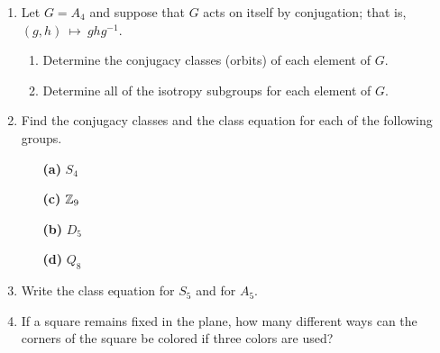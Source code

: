 {\begin{enumerate}
 
\bf\item\rm
Let $G =  A_4$ and suppose that $G$ acts on itself by conjugation;
that is, $(g,h)~\mapsto~ghg^{-1}$. 
\begin{enumerate}
 
 \bf\item\rm
Determine the conjugacy classes (orbits) of each element of $G$.
 
 \bf\item\rm
Determine all of the isotropy subgroups for each element of $G$.
 
\end{enumerate}
 
 
\bf\item\rm
Find the conjugacy classes and the class equation for each of the
following groups. 
 
\vspace{3pt}
 
\hspace{-7pt}
\begin{minipage}[t]{4.6in}
\noindent
\begin{minipage}[t]{2.25in}
\begin{itemize}
 
 \item[{\bf (a)}]
$S_4$
 
 \item[{\bf (c)}]
${\Bbb Z}_9$
 
\end{itemize}
\end{minipage} \hfill
\begin{minipage}[t]{2.25in}
\begin{itemize}
 
 \item[{\bf (b)}]
$D_5$
 
 \item[{\bf (d)}]
$Q_8$
 
\end{itemize}
\end{minipage}
\end{minipage}
 
\vspace{2pt}
 
 
 
\bf\item\rm  %
Write the class equation for $S_5$ and for $A_5$.
 
 
\bf\item\rm
If a square remains fixed in the plane, how many different ways can
the corners of the square be colored if three colors are used?
 

\end{enumerate}}
